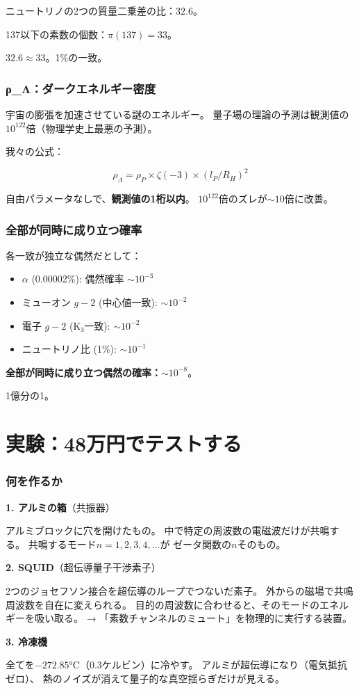 \documentclass[12pt,a4paper]{article}
\begin{document}
ニュートリノの2つの質量二乗差の比：$32.6$。

137以下の素数の個数：$\pi(137) = 33$。

$32.6 \approx 33$。1\%の一致。

\section{ρ\_Λ：ダークエネルギー密度}

宇宙の膨張を加速させている謎のエネルギー。
量子場の理論の予測は観測値の$10^{122}$倍（物理学史上最悪の予測）。

我々の公式：

$$\rho_\Lambda = \rho_P \times \zeta(-3) \times (l_P/R_H)^2$$

自由パラメータなしで、\textbf{観測値の1桁以内}。
$10^{122}$倍のズレが$\sim 10$倍に改善。

\section{全部が同時に成り立つ確率}

各一致が独立な偶然だとして：
\begin{itemize}
\item $\alpha$ (0.00002\%): 偶然確率 $\sim 10^{-3}$
\item ミューオン $g-2$ (中心値一致): $\sim 10^{-2}$
\item 電子 $g-2$ (K₃一致): $\sim 10^{-2}$
\item ニュートリノ比 (1\%): $\sim 10^{-1}$
\end{itemize}

\textbf{全部が同時に成り立つ偶然の確率：$\sim 10^{-8}$}。

1億分の1。

\part{実験：48万円でテストする}

\section{何を作るか}

\begin{physbox}[3つの要素]
\textbf{1. アルミの箱}（共振器）

アルミブロックに穴を開けたもの。
中で特定の周波数の電磁波だけが共鳴する。
共鳴するモード$n = 1, 2, 3, 4, \ldots$が
ゼータ関数の$n$そのもの。

\textbf{2. SQUID}（超伝導量子干渉素子）

2つのジョセフソン接合を超伝導のループでつないだ素子。
外からの磁場で共鳴周波数を自在に変えられる。
目的の周波数に合わせると、そのモードのエネルギーを吸い取る。
→ 「素数チャンネルのミュート」を物理的に実行する装置。

\textbf{3. 冷凍機}

全てを$-272.85$°C（0.3ケルビン）に冷やす。
アルミが超伝導になり（電気抵抗ゼロ）、
熱のノイズが消えて量子的な真空揺らぎだけが見える。
\end{physbox}
\end{document}
